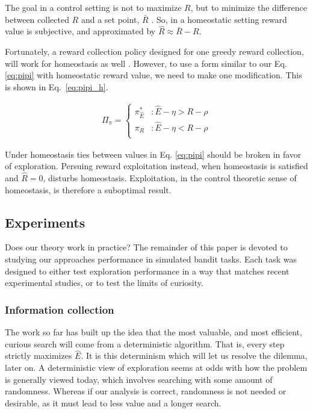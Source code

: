 The goal in a control setting is not to maximize $R$, but to minimize the difference between collected $R$ and a set point, $\bar R$ \cite{Keramati2014,Juechems2019,Munch2020}. So, in a homeostatic setting reward value is subjective, and approximated by $\hat R \approx \bar R - R$.

Fortunately, a reward collection policy designed for one greedy reward collection, will work for homeostasis as well \cite{Keramati2014}. However, to use a form similar to our Eq. \ref{eq:pipi} with homeostatic reward value, we need to make one modification. This is shown in Eq.~\ref{eq:pipi_h}. 

\begin{equation} 
    \label{eq:pipi_h}
    \begin{split}
        \Pi_{\pi} = 
        \begin{cases}
            \pi^*_{\hat{E}} & : \hat{E} - \eta > R - \rho \\
            \pi_R 	& : \hat{E} - \eta < R - \rho \\
        \end{cases}
    \end{split}
\end{equation}

Under homeostasis ties between values in Eq. \ref{eq:pipi} should be broken in favor of exploration. Persuing reward exploitation instead, when homeostasis is satisfied and $\hat R=0$, disturbs homeostasis. Exploitation, in the control theoretic sense of homeostasis, is therefore a suboptimal result. 

\subsection*{Experiments}
Does our theory work in practice? The remainder of this paper is devoted to studying our approaches performance in simulated bandit tasks. Each task was designed to either test exploration performance in a way that matches recent experimental studies, or to test the limits of curiosity. 

\subsubsection*{Information collection}
The work so far has built up the idea that the most valuable, and most efficient, curious search will come from a deterministic algorithm. That is, every step strictly maximizes $\hat E$. It is this determinism which will let us resolve the dilemma, later on. A deterministic view of exploration seems at odds with how the problem is generally viewed today, which involves searching with some amount of randomness. Whereas if our analysis is correct, randomness is not needed or desirable, as it must lead to less value and a longer search. 

